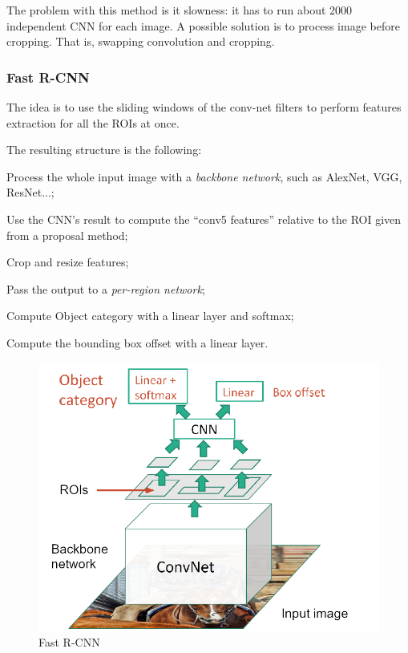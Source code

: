 The problem with this method is it slowness: it has to run about 2000 independent CNN for each image. A possible solution is to process image before cropping. That is, swapping convolution and cropping.


\subsubsection{Fast R-CNN}\label{sec:ds-detection-fast-rcnn}

The idea is to use the sliding windows of the conv-net filters to perform features extraction for all the ROIs at once.

The resulting structure is the following:
\begin{myenum}
    \item Process the whole input image with a \textit{backbone network}, such as AlexNet, VGG, ResNet...;
    \item Use the CNN's result to compute the ``conv5 features'' relative to the ROI given from a proposal method;
    \item Crop and resize features;
    \item Pass the output to a \textit{per-region network};
    \item Compute Object category with a linear layer and softmax;
    \item Compute the bounding box offset with a linear layer.
\end{myenum}

\begin{figure}[h!]
    \centering
    \includegraphics[width=0.7\linewidth]{images/fast-rcnn}
    \caption[Fast R-CNN]{Fast R-CNN}
    \label{fig:fast-rcnn}
\end{figure}

